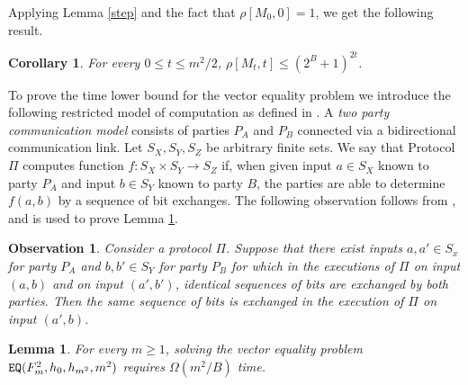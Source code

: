 \documentclass[11pt,letter]{article}
\def\EQ{\mbox{\tt EQ}}
\def\partyA{P_A}
\def\partyB{P_B}
\newtheorem{corollary}[theorem]{Corollary}
\newtheorem{lemma}[theorem]{Lemma}
\newtheorem{observation}[theorem]{Observation}
\begin{document}
Applying Lemma \ref{step} and the fact that $\rho[M_0,0] = 1$,
we get the following result. 

\begin{corollary}
\label{cl:bound-rho}
For every $0 \le t \le m^2/2$, $\rho[M_t,t] \le (2^B+1)^{2t}$.
\end{corollary}

To prove the time lower bound for the vector equality problem we introduce 
the following restricted model of computation as defined in \cite{KUS_97}.
A {\em two party communication model} consists of parties $\partyA$ 
and $\partyB$ connected via a bidirectional communication link. 
Let $S_X,S_Y,S_Z$ be arbitrary finite sets. We say that Protocol $\Pi$ computes 
function $f:S_X\times S_Y \rightarrow S_Z$  if, when given input $a\in S_X$ 
known to party $\partyA$ and input $b\in S_Y$ known to party $B$, 
the parties are able to determine $f(a,b)$  by a sequence of bit exchanges. 
The following observation follows from \cite[1.14]{KUS_97}, and is used to prove Lemma \ref{l:EQ-LB}.



\begin{observation} \label{l:similar-executions}
Consider a protocol $\Pi $.  Suppose that there exist inputs 
$a,a'\in S_x$ for party $\partyA$ and $b,b'\in S_Y$ for party $\partyB$ 
for which   in the executions of $\Pi $ on input $(a,b)$ and 
on input $(a',b')$, identical sequences of bits are exchanged by both parties. 
Then  the same sequence of bits is exchanged in the execution of 
$\Pi $ on input $(a',b)$.
\end{observation}

\begin{lemma}
\label{l:EQ-LB}
For every $m\ge 1$, solving the vector equality problem 
$\EQ(F^2_{m},h_0,h_{m^2},m^2)$ requires $\Omega(m^2/B)$ time.
\end{lemma}
\end{document}
